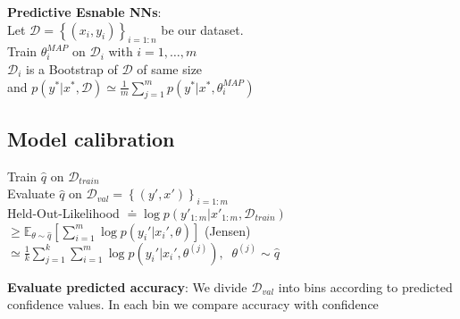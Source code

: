\textbf{Predictive Esnable NNs}: \\
Let $\mathcal{D} = \left\{(x_i,y_i)\right\}_{i=1:n}$ be our dataset. \\
Train $\theta_i^{MAP}$ on $\mathcal{D}_i$ with $ i=1,\dots,m$\\
$\mathcal{D}_i$ is a Bootstrap of $\mathcal{D}$ of same size\\
and $p(y^*\vert x^*, \mathcal{D})\simeq \frac{1}{m}\sum_{j=1}^m p(y^*\vert x^*, \theta^{MAP}_i)$ 


\subsection{Model calibration}
Train $\hat q$ on $\mathcal{D}_{train}$ \\
Evaluate $\hat q$ on $\mathcal{D}_{val}= \left\{(y',x')\right\}_{i=1:m}$\\
Held-Out-Likelihood $\doteq \log{p(y'_{1:m} \vert x'_{1:m} , \mathcal{D}_{train})}$ \\
$\geq \mathbb{E}_{\theta \sim \hat q}\left[\sum_{i=1}^m\log{p(y_i'\vert x_i', \theta)}\right]$ (Jensen)\\
$\simeq \frac{1}{k}\sum_{j=1}^k\sum_{i=1}^m\log{p(y_i'\vert x_i', \theta^{(j)})}, \;\; \theta^{(j)} \sim \hat q$

\textbf{Evaluate predicted accuracy}: We divide $\mathcal{D}_{val}$ into bins according to predicted confidence values. In each bin we compare accuracy with confidence

